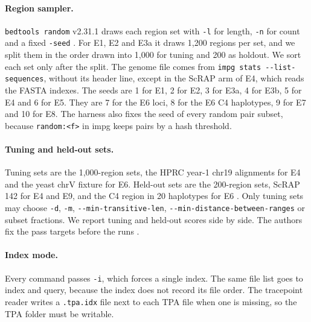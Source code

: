 \paragraph{Region sampler.}
\texttt{bedtools random} v2.31.1 draws each region set with \texttt{-l} for length, \texttt{-n} for count and a fixed \texttt{-seed} \citep{Quinlan2010bedtools}.
For E1, E2 and E3a it draws 1,200 regions per set, and we split them in the order drawn into 1,000 for tuning and 200 as holdout.
We sort each set only after the split.
The genome file comes from \texttt{impg stats -{}-list-sequences}, without its header line, except in the ScRAP arm of E4, which reads the FASTA indexes.
The seeds are 1 for E1, 2 for E2, 3 for E3a, 4 for E3b, 5 for E4 and 6 for E5.
They are 7 for the E6 loci, 8 for the E6 C4 haplotypes, 9 for E7 and 10 for E8.
The harness also fixes the seed of every random pair subset, because \texttt{random:<f>} in impg keeps pairs by a hash threshold.

\paragraph{Tuning and held-out sets.}
Tuning sets are the 1,000-region sets, the HPRC year-1 chr19 alignments for E4 and the yeast chrV fixture for E6.
Held-out sets are the 200-region sets, ScRAP 142 for E4 and E9, and the C4 region in 20 haplotypes for E6 \citep{ODonnell2023scrap}.
Only tuning sets may choose \texttt{-d}, \texttt{-m}, \texttt{-{}-min-transitive-len}, \texttt{-{}-min-distance-between-ranges} or subset fractions.
We report tuning and held-out scores side by side.
The authors fix the pass targets before the runs .

\paragraph{Index mode.}
Every command passes \texttt{-i}, which forces a single index.
The same file list goes to index and query, because the index does not record its file order.
The tracepoint reader writes a \texttt{.tpa.idx} file next to each TPA file when one is missing, so the TPA folder must be writable.


